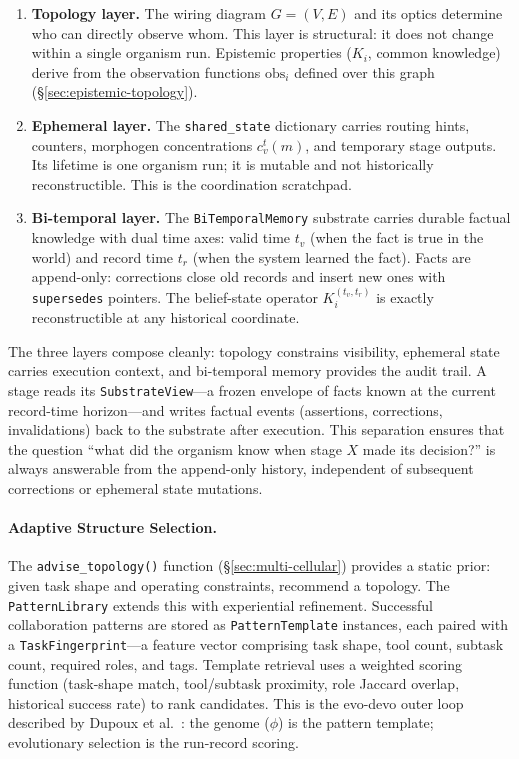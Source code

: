 \begin{enumerate}[leftmargin=*]
\item \textbf{Topology layer.}
The wiring diagram $G = (V, E)$ and its optics determine who can directly observe whom. This layer is structural: it does not change within a single organism run. Epistemic properties ($K_i$, common knowledge) derive from the observation functions $\mathrm{obs}_i$ defined over this graph (\S\ref{sec:epistemic-topology}).

\item \textbf{Ephemeral layer.}
The \texttt{shared\_state} dictionary carries routing hints, counters, morphogen concentrations $c_v^t(m)$, and temporary stage outputs. Its lifetime is one organism run; it is mutable and not historically reconstructible. This is the coordination scratchpad.

\item \textbf{Bi-temporal layer.}
The \texttt{BiTemporalMemory} substrate carries durable factual knowledge with dual time axes: valid time $t_v$ (when the fact is true in the world) and record time $t_r$ (when the system learned the fact). Facts are append-only: corrections close old records and insert new ones with \texttt{supersedes} pointers. The belief-state operator $K_i^{(t_v, t_r)}$ is exactly reconstructible at any historical coordinate.
\end{enumerate}

The three layers compose cleanly: topology constrains visibility, ephemeral state carries execution context, and bi-temporal memory provides the audit trail. A stage reads its \texttt{SubstrateView}---a frozen envelope of facts known at the current record-time horizon---and writes factual events (assertions, corrections, invalidations) back to the substrate after execution. This separation ensures that the question ``what did the organism know when stage $X$ made its decision?'' is always answerable from the append-only history, independent of subsequent corrections or ephemeral state mutations.

\paragraph{Adaptive Structure Selection.}
\label{sec:adaptive-structure}
The \texttt{advise\_topology()} function (\S\ref{sec:multi-cellular}) provides a static prior: given task shape and operating constraints, recommend a topology. The \texttt{PatternLibrary} extends this with experiential refinement. Successful collaboration patterns are stored as \texttt{PatternTemplate} instances, each paired with a \texttt{TaskFingerprint}---a feature vector comprising task shape, tool count, subtask count, required roles, and tags. Template retrieval uses a weighted scoring function (task-shape match, tool/subtask proximity, role Jaccard overlap, historical success rate) to rank candidates. This is the evo-devo outer loop described by Dupoux et al.~\cite{dupoux2026learning}: the genome ($\phi$) is the pattern template; evolutionary selection is the run-record scoring.

